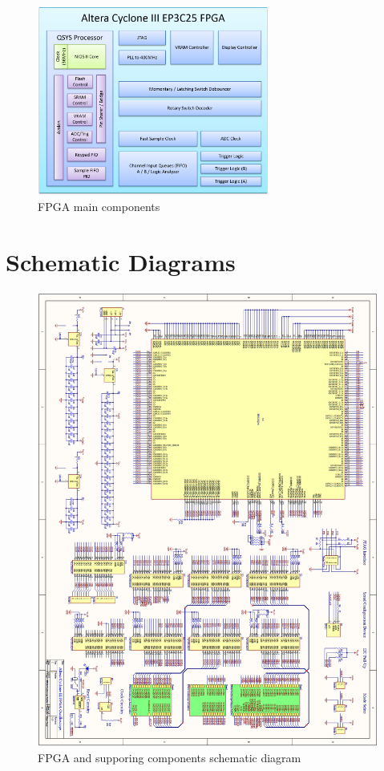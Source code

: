 \begin{appendices}
\begin{figure}[ht!]
    \centering
    \includegraphics[width=3in]{block_diagrams/fpga.png}
		\caption{FPGA main components}
\end{figure}

\chapter{Schematic Diagrams} \label{App:schematicdiagrams}

\begin{figure}[ht!]
    \centering
    \includegraphics[width=6in]{circuit/main_fpga_page.png}
		\caption{FPGA and supporing components schematic diagram}
\end{figure}


\end{appendices}
